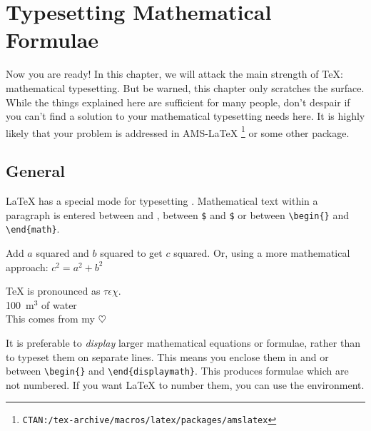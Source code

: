  
\chapter{Typesetting Mathematical Formulae}

\begin{intro}
  Now you are ready! In this chapter, we will attack the main strength
  of \TeX{}: mathematical typesetting. But be warned, this chapter
  only scratches the surface. While the things explained here are
  sufficient for many people, don't despair if you can't find a
  solution to your mathematical typesetting needs here. It is highly likely
  that your problem is addressed in AMS-\LaTeX{}%
  \footnote{\texttt{CTAN:/tex-archive/macros/latex/packages/amslatex}}
  or some other package.
\end{intro}
  
\section{General}

\LaTeX{} has a special mode for typesetting .
Mathematical text within a paragraph is entered between \ci{(}
and \ci{)},  %
between \texttt{\$} and \texttt{\$} or between
\verb|\begin{|\verb|}| and \verb|\end{math}|.

\begin{example}
Add $a$ squared and $b$ squared 
to get $c$ squared. Or, using 
a more mathematical approach:
$c^{2}=a^{2}+b^{2}$
\end{example}

\begin{example}
\TeX{} is pronounced as 
$\tau\epsilon\chi$.\\[6pt]
100~m$^{3}$ of water\\[6pt]
This comes from my $\heartsuit$
\end{example}

It is preferable to \emph{display} larger mathematical equations or formulae,
rather than to typeset them on separate lines. This means you enclose them
in \ci{[} and \ci{]} or between
\verb|\begin{|\verb|}| and
  \verb|\end{displaymath}|.  This produces formulae which are not
numbered. If you want \LaTeX{} to number them, you can use the
 environment.


